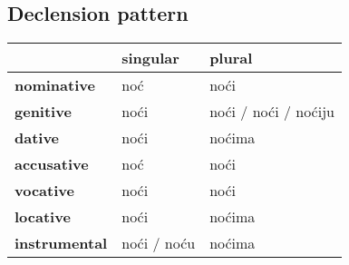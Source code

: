 \subsection*{Declension pattern}
\begin{tabularx}{\linewidth}{Xll}
\toprule
{} &     singular &                plural \\
\midrule
\textbf{nominative  } &          noć &                  noći \\
\textbf{genitive    } &         noći &  noći / noći / noćiju \\
\textbf{dative      } &         noći &                noćima \\
\textbf{accusative  } &          noć &                  noći \\
\textbf{vocative    } &         noći &                  noći \\
\textbf{locative    } &         noći &                noćima \\
\textbf{instrumental} &  noći / noću &                noćima \\
\bottomrule
\end{tabularx}

\filbreak
